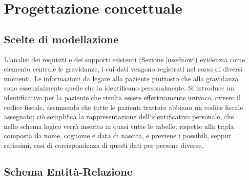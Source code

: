 \chapter{Progettazione concettuale}

\section{Scelte di modellazione}

L'analisi dei requisiti e dei supporti esistenti (Sezione \ref{usednow}) evidenzia come elemento centrale le gravidanze, i cui dati vengono registrati nel corso di diversi momenti.
Le informazioni da legare alla paziente piuttosto che alla gravidanza sono essenzialmente quelle che la identificano personalmente.
Si introduce un identificativo per la paziente che risulta essere effettivamente univoco, ovvero il codice fiscale, assumendo che tutte le pazienti trattate abbiano un codice fiscale assegnato; ciò semplifica la rappresentazione dell'identificativo personale, che nello schema logico verrà inserito in quasi tutte le tabelle, rispetto alla tripla composta da nome, cognome e data di nascita, e previene i possibili, seppur rarissimi, casi di corrispondenza di questi dati per persone diverse.

\section{Schema Entità-Relazione}